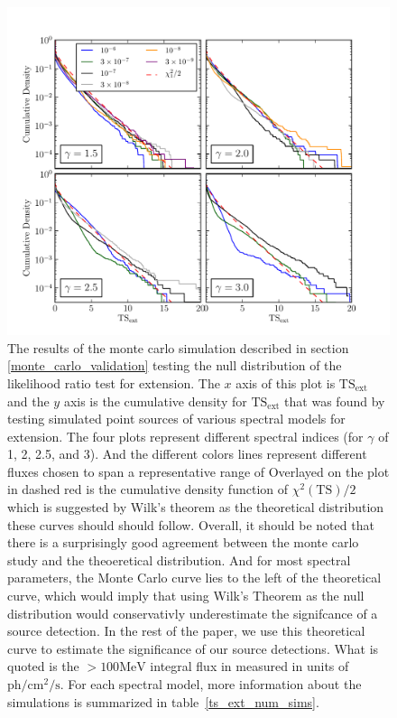\documentclass[preprint]{aastex}
\newcommand{\mev}{\text{MeV}\xspace}
\newcommand{\s}{\text{s}\xspace}
\newcommand{\ph}{\text{ph}\xspace}
\newcommand{\cm}{\text{cm}\xspace}
\newcommand{\tsext}{\ensuremath{\text{TS}_\text{ext}}\xspace}
\newcommand{\ts}{\text{TS}\xspace}
\begin{document}
\clearpage

\clearpage
\begin{figure}
  \begin{center}
    \includegraphics{mc_plots/ts_ext_emin_1000.pdf}
    \end{center}
    \caption{
    The results of the monte carlo simulation described in section
    \ref{monte_carlo_validation} testing the null distribution of
    the likelihood ratio test for extension.  The $x$ axis of this
    plot is \tsext and the $y$ axis is the cumulative density for
    \tsext that was found by testing simulated point sources of
    various spectral models for extension. The four plots represent
    different spectral indices (for $\gamma$ of 1, 2, 2.5, and 3).
    And the different colors lines represent different fluxes chosen
    to span a representative range of Overlayed on the plot in dashed
    red is the cumulative density function of $\chi^2(\ts)/2$ which is
    suggested by Wilk's theorem as the theoretical distribution these
    curves should should follow.  Overall, it should be noted that there
    is a surprisingly good agreement between the monte carlo study and
    the theoeretical distribution. And for most spectral parameters, the
    Monte Carlo curve lies to the left of the theoretical curve, which
    would imply that using Wilk's Theorem as the null distribution would
    conservativly underestimate the signifcance of a source detection. In
    the rest of the paper, we use this theoretical curve to estimate
    the significance of our source detections.  What is quoted is the
    $>100\mev$ integral flux in measured in units of $\ph/\cm^2/\s$.
    For each spectral model, more information about the simulations is
    summarized in table~\ref{ts_ext_num_sims}.
    }\label{ts_ext_mc}
  \end{figure}
\end{document}
